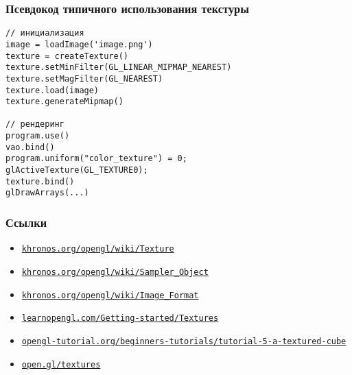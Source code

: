 \documentclass[10pt]{beamer}
\begin{document}
\begin{frame}[fragile]
\frametitle{Псевдокод типичного использования текстуры}
\begin{verbatim}
// инициализация
image = loadImage('image.png')
texture = createTexture()
texture.setMinFilter(GL_LINEAR_MIPMAP_NEAREST)
texture.setMagFilter(GL_NEAREST)
texture.load(image)
texture.generateMipmap()

// рендеринг
program.use()
vao.bind()
program.uniform("color_texture") = 0;
glActiveTexture(GL_TEXTURE0);
texture.bind()
glDrawArrays(...)
\end{verbatim}
\end{frame}

\begin{frame}[fragile]
\frametitle{Ссылки}
\begin{itemize}
\item \href{https://www.khronos.org/opengl/wiki/Texture}{\nolinkurl{khronos.org/opengl/wiki/Texture}}
\item \href{https://www.khronos.org/opengl/wiki/Sampler_Object}{\nolinkurl{khronos.org/opengl/wiki/Sampler\_Object}}
\item \href{https://www.khronos.org/opengl/wiki/Image_Format}{\nolinkurl{khronos.org/opengl/wiki/Image\_Format}}
\item \href{https://learnopengl.com/Getting-started/Textures}{\nolinkurl{learnopengl.com/Getting-started/Textures}}
\item \href{http://www.opengl-tutorial.org/beginners-tutorials/tutorial-5-a-textured-cube}{\nolinkurl{opengl-tutorial.org/beginners-tutorials/tutorial-5-a-textured-cube}}
\item \href{https://open.gl/textures}{\nolinkurl{open.gl/textures}}
\end{itemize}
\end{frame}
\end{document}
